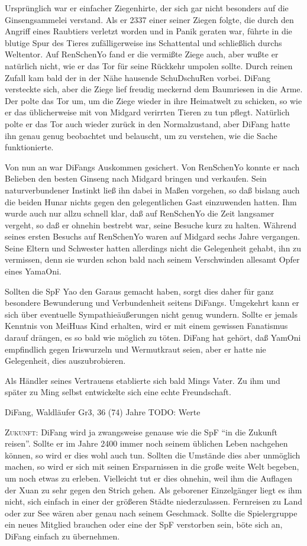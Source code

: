 \documentclass[
a4paper,
twoside,
DIV=calc,
BCOR=4mm,
fontsize=9pt,
twocolumn=on,
titlepage=on,
parskip=half
]{scrartcl}
\begin{document}
Ursprünglich war er einfacher Ziegenhirte, der sich gar nicht
besonders auf die Ginsengsammelei verstand. Als er 2337 einer seiner
Ziegen folgte, die durch den Angriff eines Raubtiers verletzt worden
und in Panik geraten war, führte in die blutige Spur des Tieres
zufälligerweise ins Schattental und schließlich durchs Weltentor. Auf
RenSchenYo fand er die vermißte Ziege auch, aber wußte er natürlich
nicht, wie er das Tor für seine Rückkehr umpolen sollte. Durch reinen
Zufall kam bald der in der Nähe hausende SchuDschuRen vorbei. DiFang
versteckte sich, aber die Ziege lief freudig meckernd dem Baumriesen
in die Arme. Der polte das Tor um, um die Ziege wieder in ihre
Heimatwelt zu schicken, so wie er das üblicherweise mit von Midgard
verirrten Tieren zu tun pflegt. Natürlich polte er das Tor auch wieder
zurück in den Normalzustand, aber DiFang hatte ihn genau genug
beobachtet und belauscht, um zu verstehen, wie die Sache
funktionierte.

Von nun an war DiFangs Auskommen gesichert. Von RenSchenYo konnte er
nach Belieben den besten Ginseng nach Midgard bringen und
verkaufen. Sein naturverbundener Instinkt ließ ihn dabei in Maßen
vorgehen, so daß bislang auch die beiden Hunar nichts gegen den
gelegentlichen Gast einzuwenden hatten. Ihm wurde auch nur allzu
schnell klar, daß auf RenSchenYo die Zeit langsamer vergeht, so daß er
ohnehin bestrebt war, seine Besuche kurz zu halten. Während seines
ersten Besuchs auf RenSchenYo waren auf Midgard sechs Jahre
vergangen. Seine Eltern und Schwester hatten allerdings nicht die
Gelegenheit gehabt, ihn zu vermissen, denn sie wurden schon bald nach
seinem Verschwinden allesamt Opfer eines YamaOni.

Sollten die SpF Yao den Garaus gemacht haben, sorgt dies daher für
ganz besondere Bewunderung und Verbundenheit seitens
DiFangs. Umgekehrt kann er sich über eventuelle Sympathieäußerungen
nicht genug wundern. Sollte er jemals Kenntnis von MeiHuas Kind
erhalten, wird er mit einem gewissen Fanatismus darauf drängen, es so
bald wie möglich zu töten. DiFang hat gehört, daß YamOni empfindlich
gegen Iriswurzeln und Wermutkraut seien, aber er hatte nie
Gelegenheit, dies auszubrobieren.

Als Händler seines Vertrauens etablierte sich bald Mings Vater. Zu ihm
und später zu Ming selbst entwickelte sich eine echte Freundschaft.

DiFang, Waldläufer Gr3, 36 (74) Jahre
TODO: Werte

\textsc{Zukunft:} DiFang wird ja zwangsweise genause wie die SpF "`in
die Zukunft reisen"'. Sollte er im Jahre 2400 immer noch seinem
üblichen Leben nachgehen können, so wird er dies wohl auch
tun. Sollten die Umstände dies aber unmöglich machen, so wird er sich
mit seinen Ersparnissen in die große weite Welt begeben, um noch etwas
zu erleben. Vielleicht tut er dies ohnehin, weil ihm die Auflagen der
Xuan zu sehr gegen den Strich gehen. Als geborener Einzelgänger liegt
es ihm nicht, sich einfach in einer der größeren Städte
niederzulassen. Fernreisen zu Land oder zur See wären aber genau nach
seinem Geschmack. Sollte die Spielergruppe ein neues Mitglied brauchen
oder eine der SpF verstorben sein, böte sich an, DiFang einfach zu
übernehmen.
\end{document}
